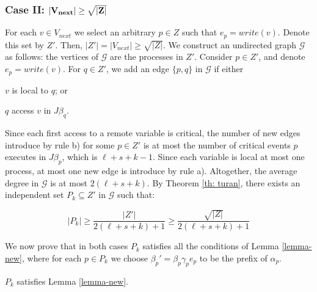 \subsubsection*{\hspace{5mm} Case II: $\bf |V_{next}| \geq \sqrt{|Z|}$}

For each $v \in V_{next}$ we select an arbitrary $p \in Z$ such that $e_p = write(v)$. Denote this set by $Z'$. Then, $|Z'|=|V_{next}| \geq \sqrt{|Z|}$.
We construct an undirected graph $\mathcal{G}$ as follows: the vertices of $\mathcal{G}$ are the processes in $Z'$. Consider $p \in Z'$, and denote $e_p = write(v)$. For $q \in Z'$, we add an edge $\{p,q\}$ in $\mathcal{G}$ if either
\begin{inparaenum}
	\item $v$ is local to $q$; or
	\item $q$ access $v$ in $J \beta_q$.
\end{inparaenum}

Since each first access to a remote variable is critical, the number of new edges introduce by rule b) for some $p \in Z'$ is at most the number of critical events $p$ executes in $J \beta_p$, which is $\ell+s+k-1$. Since each variable is local at most one process, at most one new edge is introduce by rule a).
Altogether, the average degree in $\mathcal{G}$ is at most $2(\ell+s+k)$. By Theorem \ref{th: turan}, there exists an independent set $P_k \subseteq Z'$ in $\mathcal{G}$ such that:

$$ |P_k| \geq \frac{|Z'|}{2(\ell+s+k)+1} \geq \frac{\sqrt{|Z|}}{2(\ell+s+k)+1}$$

We now prove that in both cases $P_k$ satisfies all the conditions of Lemma \ref{lemma-new}, where for each $p \in P_k$ we choose $\beta_p' = \beta_p \gamma_p e_p$ to be the prefix of $\alpha_p$.

\begin{claim-subsection}
	$P_k$ satisfies Lemma \ref{lemma-new}.
\end{claim-subsection}
 
